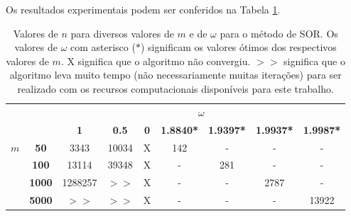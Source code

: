 \documentclass{article}
\begin{document}
\begin{enumerate}
\begin{enumerate}

                    Os resultados experimentais podem ser conferidos na Tabela \ref{tab:omega_m}.

                    \begin{table}[!h]
                        \centering
                        \begin{tabular}{cc|c|c|c|c|c|c|c|}
                            \cline{3-9}
                                                &               & \multicolumn{7}{c|}{\textbf{$\omega$}}      \\ \cline{3-9} 
                            &
                            &
                            \textbf{1} &
                            \textbf{0.5} &
                            \textbf{0} &
                            \textbf{1.8840*} &
                            \textbf{1.9397*} &
                            \textbf{1.9937*} &
                            \textbf{1.9987*} \\ \hline
                            \multicolumn{1}{|c|}{\multirow{4}{*}{\textbf{$m$}}} &
                            \textbf{50} &
                            3343 &
                            10034 &
                            X &
                            142 &
                            - &
                            - &
                            - \\ \cline{2-9} 
                            \multicolumn{1}{|c|}{} & \textbf{100}  & 13114 & 39348 & X & - & 281 & -    & -     \\ \cline{2-9} 
                            \multicolumn{1}{|c|}{} & \textbf{1000} & 1288257 & $>>$ & X & - & -   & 2787 & -     \\ \cline{2-9} 
                            \multicolumn{1}{|c|}{} & \textbf{5000} & $>>$ & $>>$ & X & - & -   & -    & 13922 \\ \hline
                        \end{tabular}
                        \caption{Valores de $n$ para diversos valores de $m$ e de $\omega$ para o método de SOR. Os valores de $\omega$ com asterisco ($*$)
                        significam os valores ótimos dos respectivos valores de $m$. X significa que o algoritmo não convergiu. $>>$ significa que o algoritmo
                        leva muito tempo (não necessariamente muitas iterações) para ser realizado com os recursos computacionais disponíveis para este trabalho.}
                        \label{tab:omega_m}
                    \end{table}


\end{enumerate}
\end{enumerate}
\end{document}

